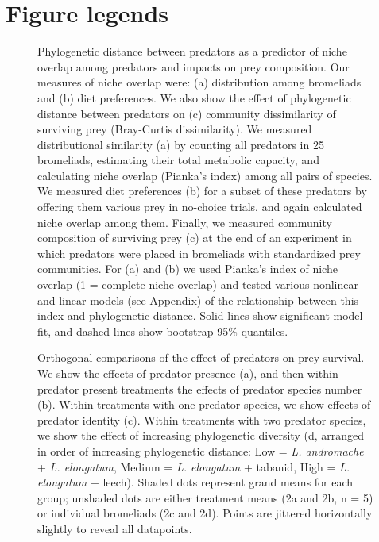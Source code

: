 \documentclass[11pt]{article}
\begin{document}
\section*{Figure legends}

\begin{figure}[htbp]
\caption[Phylogenetic distance between predators as a
predictor of niche overlap among predators and impacts on prey
composition.]{Phylogenetic distance between predators as a
predictor of niche overlap among predators and impacts on prey
composition. Our measures of niche overlap were: (a) distribution among
bromeliads and (b) diet preferences. We also show the effect of
phylogenetic distance between predators on (c) community dissimilarity
of surviving prey (Bray-Curtis dissimilarity). We measured
distributional similarity (a) by counting all predators in 25
bromeliads, estimating their total metabolic capacity, and calculating
niche overlap (Pianka's index) among all pairs of species. We measured
diet preferences (b) for a subset of these predators by offering them
various prey in no-choice trials, and again calculated niche overlap
among them. Finally, we measured community composition of surviving prey
(c) at the end of an experiment in which predators were placed in
bromeliads with standardized prey communities. For (a) and (b) we used
Pianka's index of niche overlap (1 = complete niche overlap) and tested
various nonlinear and linear models (see Appendix) of the relationship
between this index and phylogenetic distance. Solid lines show
significant model fit, and dashed lines show bootstrap 95\% quantiles.}
\label{fig:phylo_niche_overlap}
\end{figure}


\begin{figure}[htbp]
\caption[Orthogonal comparisons of the effect of predators on
prey survival. ]{Orthogonal comparisons of the effect of predators on
prey survival. We show the effects of predator presence (a), and then
within predator present treatments the effects of predator species
number (b). Within treatments with one predator species, we show effects
of predator identity (c). Within treatments with two predator species,
we show the effect of increasing phylogenetic diversity (d, arranged in
order of increasing phylogenetic distance: Low = \emph{L. andromache} +
\emph{L. elongatum}, Medium = \emph{L. elongatum} + tabanid, High =
\emph{L. elongatum} + leech). Shaded dots represent grand means for each
group; unshaded dots are either treatment means (2a and 2b, n = 5) or
individual bromeliads (2c and 2d). Points are jittered horizontally
slightly to reveal all datapoints.}
\label{fig:ortho_pred_effect}
\end{figure}
\end{document}
